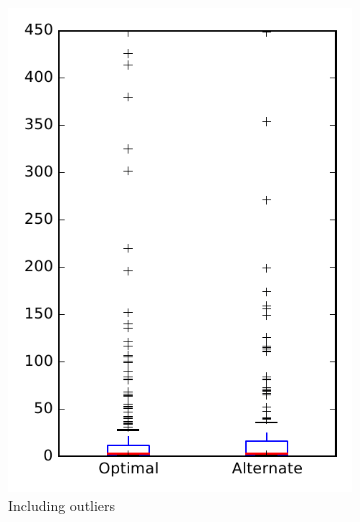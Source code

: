 
\begin{figure}
    \centering
    \begin{subfigure}{.4\textwidth}
        \centering
        \includegraphics[height=0.4\textheight]{figures/combo/flt_rq1_zookeeper}
        \caption{Including outliers}\label{fig:combo:flt:rq1:zookeeper_outlier}
    \end{subfigure}%
    \begin{subfigure}{.4\textwidth}
        \centering

\end{subfigure}
\end{figure}

